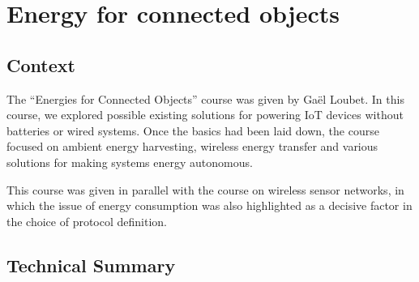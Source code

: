 \section{Energy for connected objects}
\subsection{Context}

\indent \indent The “Energies for Connected Objects” course was given by Gaël Loubet. In this course, we explored possible existing solutions for powering IoT devices without batteries or wired systems. Once the basics had been laid down, the course focused on ambient energy harvesting, wireless energy transfer and various solutions for making systems energy autonomous.

This course was given in parallel with the course on wireless sensor networks, in which the issue of energy consumption was also highlighted as a decisive factor in the choice of protocol definition.

\subsection{Technical Summary}

